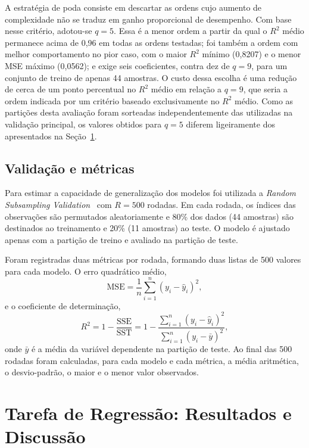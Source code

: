 \documentclass[conference]{IEEEtran}
\begin{document}
A estratégia de poda consiste em descartar as ordens cujo aumento de
complexidade não se traduz em ganho proporcional de desempenho. Com base nesse
critério, adotou-se $q = 5$. Essa é a menor ordem a partir da qual o $R^2$
médio permanece acima de 0,96 em todas as ordens testadas; foi também a ordem
com melhor comportamento no pior caso, com o maior $R^2$ mínimo (0,8207) e o
menor MSE máximo (0,0562); e exige seis coeficientes, contra dez de $q = 9$,
para um conjunto de treino de apenas 44 amostras. O custo dessa escolha é uma
redução de cerca de um ponto percentual no $R^2$ médio em relação a $q = 9$,
que seria a ordem indicada por um critério baseado exclusivamente no $R^2$
médio. Como as partições desta avaliação foram sorteadas independentemente das
utilizadas na validação principal, os valores obtidos para $q = 5$ diferem
ligeiramente dos apresentados na Seção~\ref{sec:reg-res}.

\subsection{Validação e métricas}
\label{sec:reg-validacao}

Para estimar a capacidade de generalização dos modelos foi utilizada a
\textit{Random Subsampling Validation}~\cite{b3} com $R = 500$ rodadas. Em cada
rodada, os índices das observações são permutados aleatoriamente e 80\% dos
dados (44 amostras) são destinados ao treinamento e 20\% (11 amostras) ao teste.
O modelo é ajustado apenas com a partição de treino e avaliado na partição de
teste.

Foram registradas duas métricas por rodada, formando duas listas de 500 valores
para cada modelo. O erro quadrático médio,
\begin{equation}
\mathrm{MSE} = \frac{1}{n}\sum_{i=1}^{n}(y_i - \hat{y}_i)^2,
\label{eq:mse}
\end{equation}
e o coeficiente de determinação,
\begin{equation}
R^2 = 1 - \frac{\mathrm{SSE}}{\mathrm{SST}} = 1 - \frac{\sum_{i=1}^{n}(y_i - \hat{y}_i)^2}{\sum_{i=1}^{n}(y_i - \bar{y})^2},
\label{eq:r2}
\end{equation}
onde $\bar{y}$ é a média da variável dependente na partição de teste. Ao final
das 500 rodadas foram calculadas, para cada modelo e cada métrica, a média
aritmética, o desvio-padrão, o maior e o menor valor observados.

\section{Tarefa de Regressão: Resultados e Discussão}
\label{sec:reg-res}
\end{document}
